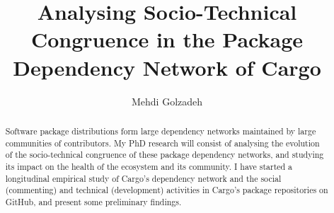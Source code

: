 



\pagestyle{plain}

\usepackage{amssymb}%
\usepackage{pifont}%

\newcommand{\commentty}[1]{{\color{blue} \sf (TY: #1)}}
\newcommand{\commentlh}[1]{{\color{red} \sf (LH: #1)}}

\def\BibTeX{{\rm B\kern-.05em{\sc i\kern-.025em b}\kern-.08em
		T\kern-.1667em\lower.7ex\hbox{E}\kern-.125emX}}





	
\title{Analysing Socio-Technical Congruence in the Package Dependency Network of Cargo}

	\author{Mehdi Golzadeh}
	
	\newcommand*{\Scale}[2][4]{\scalebox{#1}{$#2$}}%
	\newcommand{\Tool}{ComAir\xspace}
	\newcommand{\ComBugs}{30\xspace}
	
	
	
	
	
\begin{abstract}
Software package distributions form large dependency networks maintained by large communities of contributors. My PhD research will consist of analysing the evolution of the socio-technical congruence of these package dependency networks, and studying its impact on the health of the ecosystem and its community.
I have started a longitudinal empirical study of Cargo's dependency network and the social (commenting) and technical (development) activities in Cargo's package repositories on GitHub, and present some preliminary findings.
\end{abstract}


